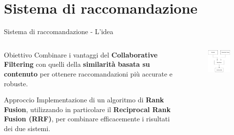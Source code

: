 \documentclass{beamer}
\begin{document}
	\section{Sistema di raccomandazione}

	\begin{frame}{Sistema di raccomandazione - L'idea}
		\begin{columns}
			\begin{column}{0.6\textwidth}
				\begin{block}{Obiettivo}
					Combinare i vantaggi del \textbf{Collaborative Filtering} con quelli della \textbf{similarità basata su contenuto} per ottenere raccomandazioni più accurate e robuste.
				\end{block}

				\begin{block}{Approccio}
					Implementazione di un algoritmo di \textbf{Rank Fusion}, utilizzando in particolare il \textbf{Reciprocal Rank Fusion (RRF)}, per combinare efficacemente i risultati dei due sistemi.
				\end{block}
			\end{column}
			\begin{column}{0.4\textwidth}
				\begin{figure}
					\centering
					\includegraphics[width=\textwidth]{Diagramma Pipeline sistema di raccomandazione.png}
				\end{figure}
			\end{column}
		\end{columns}
	\end{frame}
\end{document}
